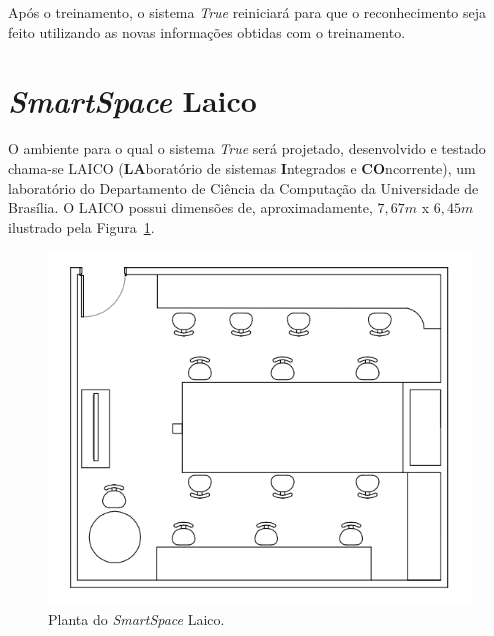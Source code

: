	Após o treinamento, o sistema \textit{True} reiniciará para que o reconhecimento seja feito utilizando as novas informações obtidas com o treinamento.

\section{\textit{SmartSpace} Laico}

	O ambiente para o qual o sistema \textit{True} será projetado, desenvolvido e testado chama-se LAICO (\textbf{LA}boratório de sistemas \textbf{I}ntegrados e \textbf{CO}ncorrente), um laboratório do Departamento de Ciência da Computação da Universidade de Brasília. O LAICO possui dimensões de, aproximadamente,  $\displaystyle 7,67m$ x $\displaystyle 6,45m$ ilustrado pela Figura~\ref{fig:laico}.

	\begin{figure}[hbt]
			\begin{center}
				\includegraphics[scale=0.6]{figuras/4.ProblemaEProposta/laico.png}
			\end{center}
			\caption{Planta do \textit{SmartSpace} Laico.}
			\label{fig:laico}
		\end{figure}	

% 













